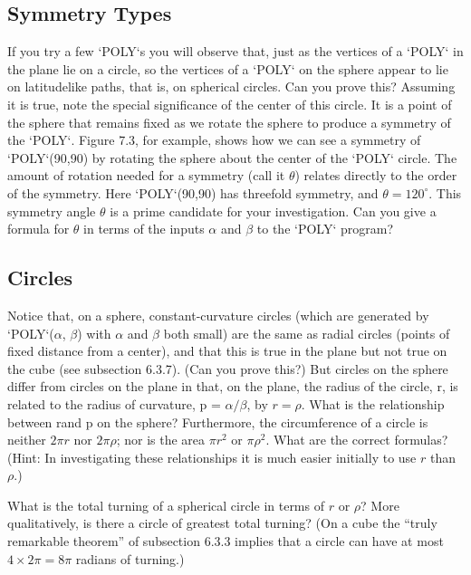 \documentclass{book}
\begin{document}
\subsection{Symmetry Types}

If you try a few \textsc{`POLY`}s you will observe that, just as the vertices of a
\textsc{`POLY`} in the plane lie on a circle, so the vertices of a \textsc{`POLY`} on the sphere
appear to lie on latitudelike paths, that is, on spherical circles. Can
you prove this? Assuming it is true, note the special significance of the
center of this circle. It is a point of the sphere that remains fixed as we
rotate the sphere to produce a symmetry of the \textsc{`POLY`}. Figure 7.3, for
example, shows how we can see a symmetry of \textsc{`POLY`}(90,90) by rotating
the sphere about the center of the \textsc{`POLY`} circle. The amount of rotation
needed for a symmetry (call it $\theta$) relates directly to the order of the
symmetry. Here \textsc{`POLY`}(90,90) has threefold symmetry, and $\theta = 120^{\circ}$.
This symmetry angle $\theta$ is a prime candidate for your investigation. Can
you give a formula for $\theta$ in terms of the inputs $\alpha$ and $\beta$ to the \textsc{`POLY`}
program?

\subsection{Circles}

Notice that, on a sphere, constant-curvature circles (which are generated
by \textsc{`POLY`}($\alpha$, $\beta$) with $\alpha$ and $\beta$ both small) are the same as radial circles
(points of fixed distance from a center), and that this is true in the plane
but not true on the cube (see subsection 6.3.7). (Can you prove this?)
But circles on the sphere differ from circles on the plane in that, on the
plane, the radius of the circle, r, is related to the radius of curvature,
p = $\alpha / \beta$, by $r = \rho$. What is the relationship between rand p on the
sphere? Furthermore, the circumference of a circle is neither $2 \pi r$ nor
$2 \pi \rho$; nor is the area $\pi r^2$ or $\pi \rho^2$. What are the correct formulas? (Hint:
In investigating these relationships it is much easier initially to use $r$
than $\rho$.)

What is the total turning of a spherical circle in terms of $r$ or $\rho$? More
qualitatively, is there a circle of greatest total turning? (On a cube the
``truly remarkable theorem'' of subsection 6.3.3 implies that a circle can
have at most $4 \times 2 \pi = 8 \pi$ radians of turning.)
\end{document}
